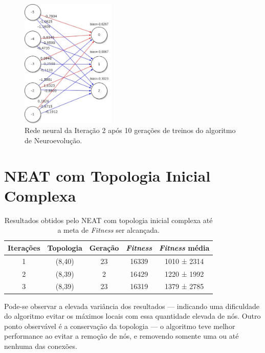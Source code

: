 \begin{figure}[htb]
        \centering
        \caption{\label{fig_nn5}Rede neural da Iteração 2 após 10 gerações de treinos do algoritmo de Neuroevolução.}
        \includegraphics[width=0.4\textwidth]{images/nn5.png}
\end{figure}

\section{NEAT com Topologia Inicial Complexa}

\begin{table}[htb]
	\centering
    \caption{\label{tabela_neatc}Resultados obtidos pelo NEAT com topologia inicial complexa até a meta de \textit{Fitness} ser alcançada.}
    \begin{tabular}{ccccc}
        \hline
		\textbf{Itera{\c c}{\~o}es} & \textbf{Topologia} & \textbf{Gera{\c c}{\~a}o} & \textbf{\textit{Fitness}} & \textbf{\textit{Fitness} média} \\ \hline
		1 & (8,40)  & 23  & 16339  & 1010 ± 2314   \\ \hline
		2 & (8,39)  & 2   & 16429  & 1220 ± 1992   \\ \hline
		3 & (8,39)  & 23  & 16319  & 1379 ± 2785   \\ \hline
    \end{tabular}
\end{table}

Pode-se observar a elevada vari{\^a}ncia dos resultados — indicando uma
dificuldade do algoritmo evitar os m{\'a}ximos locais com essa quantidade
elevada de n{\'o}s. Outro ponto observável é a conservação da topologia — o algoritmo
teve melhor performance ao evitar a remo{\c c}{\~a}o de nós, e removendo
somente uma ou at{\'e} nenhuma das conex{\~o}es.

